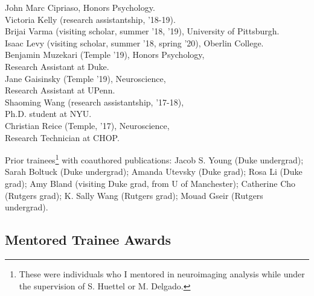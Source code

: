 \documentclass[11pt, letterpaper]{article}
\begin{document}
\begin{tabbing}
\> John Marc Cipriaso, Honors Psychology. \\
\> Victoria Kelly (research assistantship, '18-19). \\
\> Brijai Varma (visiting scholar, summer '18, '19), University of Pittsburgh. \\
\> Isaac Levy (visiting scholar, summer '18, spring '20), Oberlin College. \\
\> Benjamin Muzekari (Temple '19), Honors Psychology, \\
\> \> Research Assistant at Duke. \\
\> Jane Gaisinsky (Temple '19), Neuroscience, \\
\> \> Research Assistant at UPenn. \\
\> Shaoming Wang (research assistantship, '17-18), \\
\> \> Ph.D. student at NYU. \\
\> Christian Reice (Temple, '17), Neuroscience, \\
\> \> Research Technician at CHOP.

\end{tabbing}

\begin{hangparas}{.5in}{1}
Prior trainees\footnote{These were individuals who I mentored in neuroimaging analysis while under the supervision of S. Huettel or M. Delgado.} with coauthored publications: Jacob S. Young (Duke undergrad); Sarah Boltuck (Duke undergrad); Amanda Utevsky (Duke grad); Rosa Li (Duke grad); Amy Bland (visiting Duke grad, from U of Manchester); Catherine Cho (Rutgers grad); K. Sally Wang (Rutgers grad); Mouad Gseir (Rutgers undergrad). \\ [.1cm]
\end{hangparas}


\subsection*{Mentored Trainee Awards}
\end{document}
